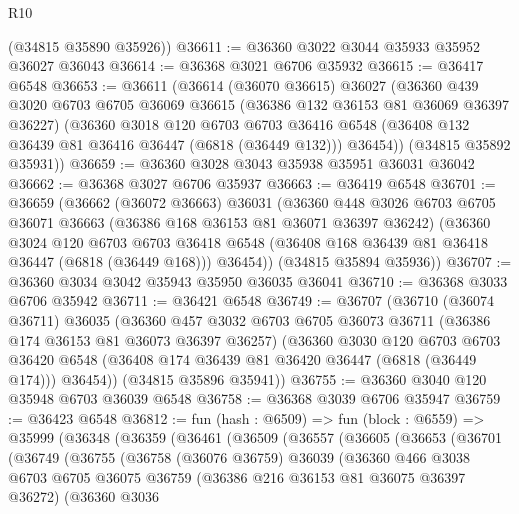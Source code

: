 \begin{lexlean}{R10}
\begin{coremodule}
      (@34815 @35890 @35926))
@36611 := @36360 @3022 @3044 @35933 @35952 @36027 @36043
@36614 := @36368 @3021 @6706 @35932
@36615 := @36417 @6548
@36653 := @36611
    (@36614
      (@36070 @36615)
      @36027
      (@36360
        @439
        @3020
        @6703
        @6705
        @36069
        @36615
        (@36386 @132 @36153 @81 @36069 @36397 @36227)
        (@36360
          @3018
          @120
          @6703
          @6703
          @36416
          @6548
          (@36408 @132 @36439 @81 @36416 @36447 (@6818 (@36449 @132)))
          @36454))
      (@34815 @35892 @35931))
@36659 := @36360 @3028 @3043 @35938 @35951 @36031 @36042
@36662 := @36368 @3027 @6706 @35937
@36663 := @36419 @6548
@36701 := @36659
    (@36662
      (@36072 @36663)
      @36031
      (@36360
        @448
        @3026
        @6703
        @6705
        @36071
        @36663
        (@36386 @168 @36153 @81 @36071 @36397 @36242)
        (@36360
          @3024
          @120
          @6703
          @6703
          @36418
          @6548
          (@36408 @168 @36439 @81 @36418 @36447 (@6818 (@36449 @168)))
          @36454))
      (@34815 @35894 @35936))
@36707 := @36360 @3034 @3042 @35943 @35950 @36035 @36041
@36710 := @36368 @3033 @6706 @35942
@36711 := @36421 @6548
@36749 := @36707
    (@36710
      (@36074 @36711)
      @36035
      (@36360
        @457
        @3032
        @6703
        @6705
        @36073
        @36711
        (@36386 @174 @36153 @81 @36073 @36397 @36257)
        (@36360
          @3030
          @120
          @6703
          @6703
          @36420
          @6548
          (@36408 @174 @36439 @81 @36420 @36447 (@6818 (@36449 @174)))
          @36454))
      (@34815 @35896 @35941))
@36755 := @36360 @3040 @120 @35948 @6703 @36039 @6548
@36758 := @36368 @3039 @6706 @35947
@36759 := @36423 @6548
@36812 := fun (hash : @6509) =>
  fun (block : @6559) =>
  @35999
    (@36348
      (@36359
        (@36461
          (@36509
            (@36557
              (@36605
                (@36653
                  (@36701
                    (@36749
                      (@36755
                        (@36758
                          (@36076 @36759)
                          @36039
                          (@36360
                            @466
                            @3038
                            @6703
                            @6705
                            @36075
                            @36759
                            (@36386 @216 @36153 @81 @36075 @36397 @36272)
                            (@36360
                              @3036

\end{coremodule}
\end{lexlean}
